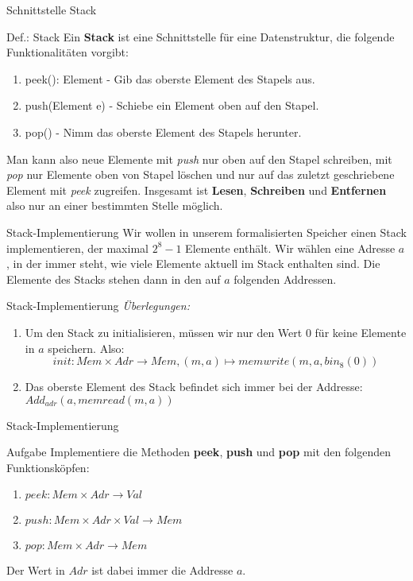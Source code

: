 \begin{frame}{Schnittstelle Stack}
	\begin{block}{Def.: Stack}
		Ein \textbf{Stack} ist eine Schnittstelle für eine Datenstruktur, die folgende Funktionalitäten vorgibt:
		\begin{enumerate}
			\item peek(): Element  -  Gib das oberste Element des Stapels aus.
			\item push(Element e)  -  Schiebe ein Element oben auf den Stapel.
			\item pop()  -  Nimm das oberste Element des Stapels herunter.
		\end{enumerate}

		\medskip

		Man kann also neue Elemente mit \textit{push} nur oben auf den Stapel schreiben, mit \textit{pop} nur Elemente oben von Stapel löschen und nur auf das zuletzt geschriebene Element mit \textit{peek} zugreifen. Insgesamt ist \textbf{Lesen}, \textbf{Schreiben} und \textbf{Entfernen} also nur an einer bestimmten Stelle möglich.
	\end{block}
\end{frame}

\begin{frame}{Stack-Implementierung}
	Wir wollen in unserem formalisierten Speicher einen Stack implementieren, der maximal $2^8 - 1$ Elemente enthält. Wir wählen eine Adresse $a$, in der immer steht, wie viele Elemente aktuell im Stack enthalten sind. Die Elemente des Stacks stehen dann in den auf $a$ folgenden Addressen.
\end{frame}
	
\begin{frame}{Stack-Implementierung}
	\emph{Überlegungen:}
	\begin{enumerate}
		\item Um den Stack zu initialisieren, müssen wir nur den Wert $0$ für keine Elemente in $a$ speichern. Also:
			\[init: Mem \times Adr \to Mem, (m,a) \mapsto memwrite(m,a,bin_8(0))\]
		\item Das oberste Element des Stack befindet sich immer bei der Addresse: $Add_{adr}(a, memread(m,a))$
	\end{enumerate}
\end{frame}

\begin{frame}{Stack-Implementierung}
	\begin{exampleblock}{Aufgabe}
		Implementiere die Methoden \textbf{peek}, \textbf{push} und \textbf{pop} mit den folgenden Funktionsköpfen:
		\begin{enumerate}
			\item $peek: Mem \times Adr \to Val$
			\item $push: Mem \times Adr \times Val \to Mem$
			\item $pop: Mem \times Adr \to Mem$
		\end{enumerate}
		Der Wert in $Adr$ ist dabei immer die Addresse $a$.
	\end{exampleblock}
\end{frame}